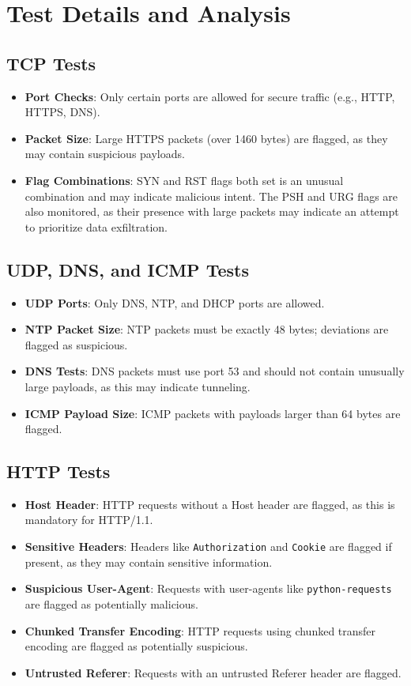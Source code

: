 \documentclass{article}
\begin{document}
\section{Test Details and Analysis}

\subsection{TCP Tests}
\begin{itemize}
    \item \textbf{Port Checks}: Only certain ports are allowed for secure traffic (e.g., HTTP, HTTPS, DNS).
    \item \textbf{Packet Size}: Large HTTPS packets (over 1460 bytes) are flagged, as they may contain suspicious payloads.
    \item \textbf{Flag Combinations}: SYN and RST flags both set is an unusual combination and may indicate malicious intent. The PSH and URG flags are also monitored, as their presence with large packets may indicate an attempt to prioritize data exfiltration.
\end{itemize}

\subsection{UDP, DNS, and ICMP Tests}
\begin{itemize}
    \item \textbf{UDP Ports}: Only DNS, NTP, and DHCP ports are allowed.
    \item \textbf{NTP Packet Size}: NTP packets must be exactly 48 bytes; deviations are flagged as suspicious.
    \item \textbf{DNS Tests}: DNS packets must use port 53 and should not contain unusually large payloads, as this may indicate tunneling.
    \item \textbf{ICMP Payload Size}: ICMP packets with payloads larger than 64 bytes are flagged.
\end{itemize}

\subsection{HTTP Tests}
\begin{itemize}
    \item \textbf{Host Header}: HTTP requests without a Host header are flagged, as this is mandatory for HTTP/1.1.
    \item \textbf{Sensitive Headers}: Headers like \texttt{Authorization} and \texttt{Cookie} are flagged if present, as they may contain sensitive information.
    \item \textbf{Suspicious User-Agent}: Requests with user-agents like \texttt{python-requests} are flagged as potentially malicious.
    \item \textbf{Chunked Transfer Encoding}: HTTP requests using chunked transfer encoding are flagged as potentially suspicious.
    \item \textbf{Untrusted Referer}: Requests with an untrusted Referer header are flagged.
\end{itemize}
\end{document}

